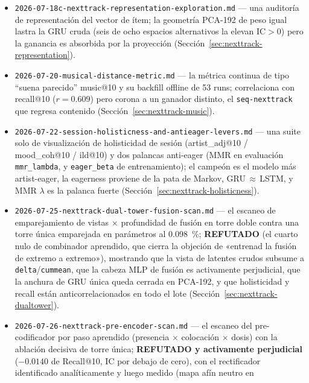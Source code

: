 \documentclass[11pt]{article}
\begin{document}
\begin{itemize}
    endurecimiento en segunda partición sobre una partición disjunta con 0.64 de fríos
    (paired $\Delta$ $+\num{0.0426}$ IC$>$0) (Sección~\ref{sec:nexttrack-projection-scan}).
  \item \texttt{2026-07-18c-nexttrack-representation-exploration.md} --- una auditoría de
    representación del vector de ítem; la geometría PCA-192 de peso igual lastra la GRU cruda
    (seis de ocho espacios alternativos la elevan IC$>$0) pero la ganancia es absorbida por la
    proyección (Sección~\ref{sec:nexttrack-representation}).
  \item \texttt{2026-07-20-musical-distance-metric.md} --- la métrica continua de tipo
    ``suena parecido'' music@10 y su backfill offline de 53 runs; correlaciona con recall@10
    ($r=\num{0.609}$) pero corona a un ganador distinto, el \texttt{seq-nexttrack} que regresa
    contenido (Sección~\ref{sec:nexttrack-music}).
  \item \texttt{2026-07-22-session-holisticness-and-antieager-levers.md} ---
    una suite solo de visualización de holisticidad de sesión (artist\_adj@10 /
    mood\_coh@10 / ild@10) y dos palancas anti-eager (MMR en evaluación
    \texttt{mmr\_lambda}, y \texttt{eager\_beta} de entrenamiento); el campeón es el
    modelo más artist-eager, la eagerness proviene de la pata de Markov,
    GRU\,$\approx$\,LSTM, y MMR $\lambda$ es la palanca fuerte
    (Sección~\ref{sec:nexttrack-holisticness}).
  \item \texttt{2026-07-25-nexttrack-dual-tower-fusion-scan.md} --- el escaneo de
    emparejamiento de vistas $\times$ profundidad de fusión en torre doble contra
    una torre única emparejada en parámetros al \SI{0.098}{\percent};
    \textbf{REFUTADO} (el cuarto nulo de combinador aprendido, que cierra la
    objeción de «entrenad la fusión de extremo a extremo»), mostrando que la vista
    de latentes crudos subsume a \texttt{delta}/\texttt{cummean}, que la cabeza
    MLP de fusión es activamente perjudicial, que la anchura de GRU única queda
    cerrada en PCA-192, y que holisticidad y recall están anticorrelacionados en
    todo el lote (Sección~\ref{sec:nexttrack-dualtower}).
  \item \texttt{2026-07-26-nexttrack-pre-encoder-scan.md} --- el escaneo del
    pre-codificador por paso aprendido (presencia $\times$ colocación $\times$
    dosis) con la ablación decisiva de torre única; \textbf{REFUTADO y activamente
    perjudicial} ($-\num{0.0140}$ de Recall@10, IC por debajo de cero), con el
    rectificador identificado analíticamente y luego medido (mapa afín neutro en

\end{itemize}
\end{document}
